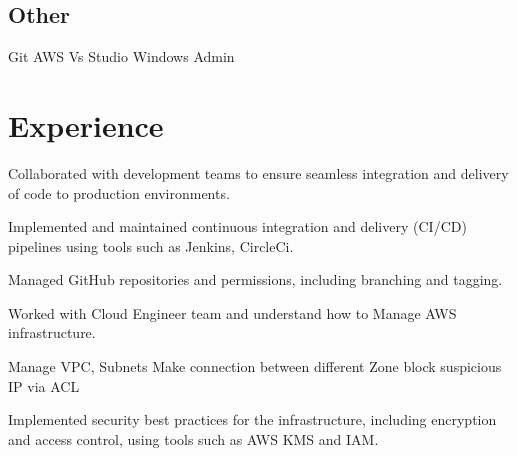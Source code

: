 \documentclass[]{deedy-resume-openfont}
\begin{document}
\begin{minipage}[t]{0.33\textwidth}
\subsection{Other}
Git \textbullet{}   AWS \textbullet{} Vs Studio \textbullet{} Windows Admin \\
%
%

\end{minipage} 
\hfill
\begin{minipage}[t]{0.66\textwidth} 


\section{Experience}
\sectionsep
{}
\vspace{\topsep}
\begin{tightemize}
\item Collaborated with development teams to ensure seamless integration and delivery of code to production environments. 
\item Implemented and maintained continuous integration and delivery (CI/CD) pipelines using tools such as Jenkins, CircleCi.
\item Managed GitHub repositories and permissions, including branching 
and tagging.
\end{tightemize}
\sectionsep


\begin{tightemize}
\item Worked with Cloud Engineer team and understand how to Manage AWS infrastructure.
\item Manage VPC, Subnets Make connection between different Zone block 
suspicious IP via ACL
\item Implemented security best practices for the infrastructure, including encryption and access control, using tools such as AWS KMS and IAM.



\end{tightemize}
\end{minipage}
\end{document}
